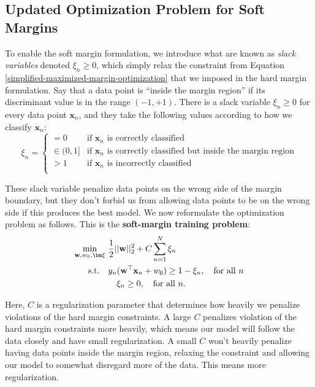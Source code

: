 \subsection{Updated Optimization Problem for Soft Margins}

To enable the soft margin formulation, we introduce what are known as \textit{slack variables} denoted $\xi_{n} \geq 0$, which simply relax the constraint from Equation \ref{simplified-maximized-margin-optimization} that we imposed in the hard margin formulation.
Say that a data point is ``inside the margin region'' if its discriminant value is in the range $(-1,+1)$.
%
There is a slack variable $\xi_{n} \geq 0$ for every data point $\textbf{x}_{n}$, and they take the following values according to how we classify $\textbf{x}_{n}$:
%
\begin{equation} \label{slack-variable-values}
	\xi_{n} = \begin{cases}
	 	= 0 & \text{if  $\textbf{x}_{n}$  is correctly classified} \\
		\in (0, 1] & \text{if $\textbf{x}_{n}$  is correctly classified but inside the  margin region} \\
		> 1 & \text{if $\textbf{x}_{n}$ is  incorrectly classified} \\
	\end{cases}
      \end{equation}
      
      These slack variable penalize data points on the wrong side of the margin boundary, but they don't forbid us from allowing data points to be on the wrong side if this produces the best model.
      We now reformulate the optimization problem as follows. This is the {\bf soft-margin training problem}:
%
%
      \begin{align} \label{soft-margin-optimization-problem}
  \underset{\textbf{w}, w_{0}, \bm \xi}{\min}\ &  \frac{1}{2} ||\textbf{w}||_2^{2} + C \sum_{n=1}^{N} \xi_{n}\\
  \mbox{s.t.}\quad & y_{n}(\textbf{w}^\top\textbf{x}_{n} + w_{0}) \geq 1 - \xi_{n}, \quad \mbox{for all $n$} \notag \\
  &\quad \xi_{n} \geq 0, \quad \mbox{for all $n$}. \notag
\end{align}

Here, $C$ is a regularization parameter that determines how heavily we penalize violations of the hard margin constraints. A large $C$ penalizes violation of the hard margin constraints more heavily, which means our model will follow the data closely and have small regularization. A small $C$ won't heavily penalize having data points inside the margin region, relaxing the constraint and allowing our model to somewhat disregard more of the data. This means more regularization.

